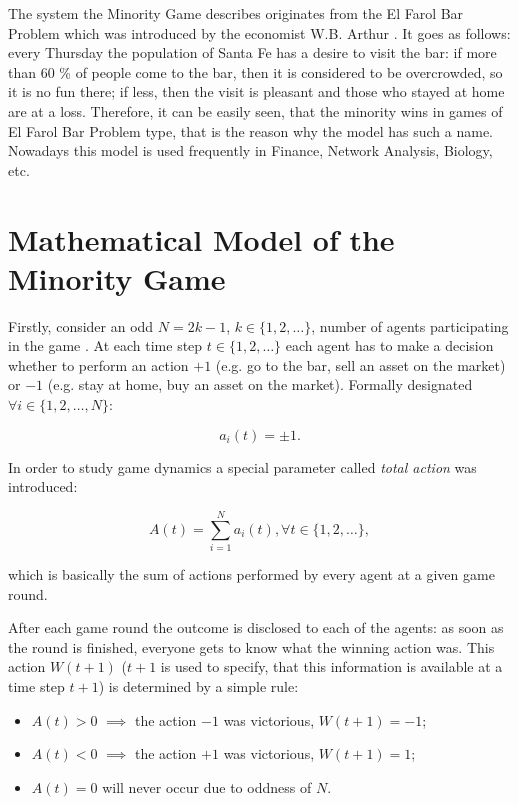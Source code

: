 \documentclass[12pt,american,czech]{article}
\begin{document}
\medskip
 
The system the Minority Game describes originates from the El Farol Bar Problem which was introduced by the economist W.B. Arthur \cite{ARTHUR1994}. It goes as follows: every Thursday the population of Santa Fe has a desire to visit the bar: if more than 60 \% of people come to the bar, then it is considered to be overcrowded, so it is no fun there; if less, then the visit is pleasant and those who stayed at home are at a loss. Therefore, it can be easily seen, that the minority wins in games of El Farol Bar Problem type, that is the reason why the model has such a name. Nowadays this model is used frequently in Finance, Network Analysis, Biology, etc. \cite{CHALLET2005}

\section{Mathematical Model of the Minority Game}

Firstly, consider an odd $N=2k-1$, $k\in\{1,2,\dots\}$, number of agents participating in the game \cite{CHALLET1997,MORO2004,CHALLET2005,JOHNSON2003}. At each time step $t\in\{1,2,\dots\}$ each agent has to make a decision whether to perform an action $+1$ (e.g. go to the bar, sell an asset on the market) or $-1$ (e.g. stay at home, buy an asset on the market). Formally designated $\forall i\in\{1,2,\dots,N\}$:

\begin{equation}
a_{i}(t)=\pm 1.
\end{equation}

In order to study game dynamics a special parameter called \textit{total action} was introduced: 

\begin{equation}
A(t)=\sum_{i=1}^{N}a_{i}(t), \forall t\in\{1,2,\dots\},
\end{equation}

\noindent
which is basically the sum of actions performed by every agent at a given game round.

\medskip

After each game round the outcome is disclosed to each of the agents: as soon as the round is finished, everyone gets to know what the winning action was. This action $W(t+1)$ ($t+1$ is used to specify, that this information is available at a time step $t+1$) is determined by a simple rule:

\begin{itemize}
\item $A(t)>0$ $\implies$ the action $-1$ was victorious, $W(t+1)=-1$;
\item $A(t)<0$ $\implies$ the action $+1$ was victorious, $W(t+1)=1$;
\item $A(t)=0$ will never occur due to oddness of $N$.
\end{itemize} 
\end{document}
